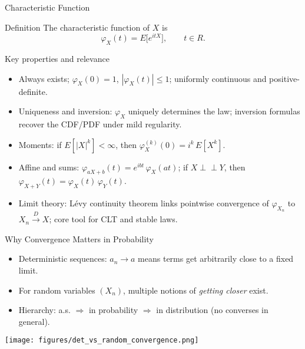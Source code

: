 \documentclass{beamer}
\def\E{E}%
\def\mathbb#1{#1}%
\def\mathcal#1{#1}%
\newcommand{\R}{\mathbb{R}}
\newcommand{\E}{\mathbb{E}}
\newcommand{\1}{\mathbf{1}}
\newcommand{\indep}{\perp\!\!\!\perp}
\newcommand{\tod}{\xrightarrow{\,\mathcal{D}\,}}
\begin{document}
\begin{frame}{Characteristic Function}{}
  {\small
    \begin{block}{Definition}
      The characteristic function of $X$ is
      \[
        \varphi_X(t) = \E\big[e^{itX}\big], \qquad t\in\R.
      \]
    \end{block}
    \begin{block}{Key properties and relevance}
    \begin{itemize}\setlength{\itemsep}{0.15em}
        \item Always exists; $\varphi_X(0)=1$, $|\varphi_X(t)|\le 1$; uniformly continuous and positive-definite.
        \item Uniqueness and inversion: $\varphi_X$ uniquely determines the law; inversion formulas recover the CDF/PDF under mild regularity.
        \item Moments: if $\E[|X|^k]<\infty$, then $\varphi_X^{(k)}(0)= i^k\,\E[X^k]$.
        \item Affine and sums: $\varphi_{aX+b}(t)= e^{ibt}\,\varphi_X(at)$; if $X\indep Y$, then $\varphi_{X+Y}(t)=\varphi_X(t)\,\varphi_Y(t)$.
        \item Limit theory: L\'evy continuity theorem links pointwise convergence of $\varphi_{X_n}$ to $X_n\tod X$; core tool for CLT and stable laws.
      \end{itemize}
    \end{block}
  }
\end{frame}

\begin{frame}{Why Convergence Matters in Probability}
  \begin{itemize}
    \item Deterministic sequences: $a_n\to a$ means terms get arbitrarily close to a fixed limit.
    \item For random variables $(X_n)$, multiple notions of \emph{getting closer} exist.
    \item Hierarchy: \alert{a.s. $\Rightarrow$ in probability $\Rightarrow$ in distribution} (no converses in general).
  \end{itemize}
  \medskip
  \begin{center}
    \texttt{[image: figures/det\_vs\_random\_convergence.png]}
  \end{center}
\end{frame}
\end{document}

